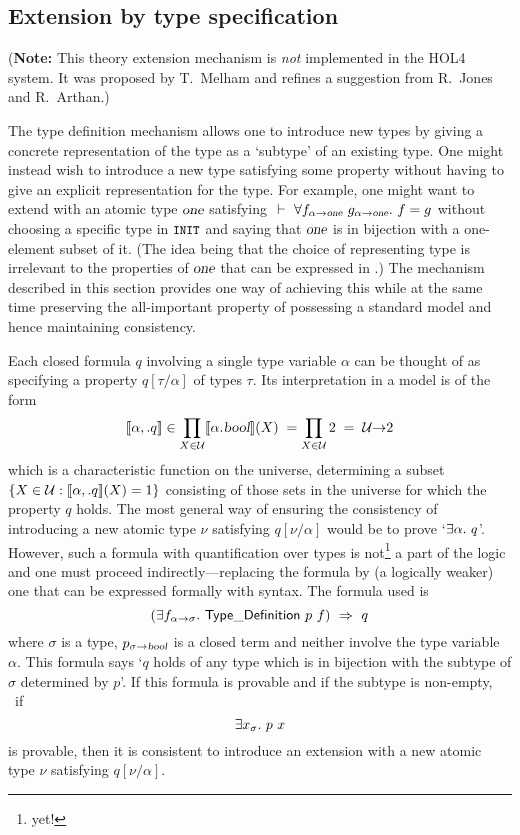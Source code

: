 \subsection{Extension by type specification}
\label{tyspecs}
\noindent
(\textbf{Note:} This theory extension mechanism is \emph{not}
implemented in the HOL4 system. It was proposed by T.~Melham and
refines a suggestion from R.~Jones and R.~Arthan.)

\smallskip
\noindent The type definition
mechanism allows one to introduce new types by giving a concrete
representation of the type as a `subtype' of an existing type. One
might instead wish to introduce a new type satisfying some property
without having to give an explicit representation for the type. For
example, one might want to extend  with an atomic type
$\textsl{one}$ satisfying $\ \vdash\ \forall f_{\alpha{\to}\textsl{one}}\
  g_{\alpha{\to}\textsl{one}}.\ f=g$ without choosing a specific type in
$\hbox{{\small\tt INIT}}$ and saying that $\textsl{one}$ is in bijection with a
one-element subset of it. (The idea being that the choice of
representing type is irrelevant to the properties of $\textsl{one}$ that
can be expressed in \HOL.) The mechanism described in this section
provides one way of achieving this while at the same time preserving
the all-important property of possessing a standard model and hence
maintaining consistency.

Each closed formula $q$ involving a single type variable $\alpha$ can
be thought of as specifying a property $q[\tau/\alpha]$ of types
$\tau$. Its interpretation in a model is of the form
\[
[\![\alpha,.q]\!]\in \prod_{X\in{\cal U}}[\![\alpha.\textsl{bool}]\!](X)
\;= \prod_{X\in{\cal U}}\mbox{\rm 2} \;=\; {\cal U}{\to}\mbox{\rm 2}
\]
which is a characteristic function on the universe, determining a
subset $\{X\in{\cal U}:[\![\alpha,.q]\!](X)=1\}$ consisting of those
sets in the universe for which the property $q$ holds. The most
general way of ensuring the consistency of introducing a new atomic
type $\nu$ satisfying $q[\nu/\alpha]$ would be to prove
`$\exists \alpha.\ q$'. However, such a
formula with quantification over types is not\footnote{yet!} a part of
the \HOL{} logic and one must proceed indirectly---replacing the
formula by (a logically weaker) one that can be expressed formally with
\HOL{} syntax. The formula used is
\[
(\exists f_{\alpha{\to}\sigma}.\ {\sf Type\_Definition}\ p\ f)\ \Rightarrow\ q
\]
where $\sigma$ is a type, $p_{\sigma{\to}\textsl{bool}}$ is a closed term
and neither involve the type variable $\alpha$. This formula says `$q$
holds of any type which is in bijection with the subtype of $\sigma$
determined by $p$'. If this formula is provable and if the subtype is
non-empty, \ie\ if
\[
\exists x_\sigma.\ p\ x
\]
is provable, then it is consistent to introduce an extension with a new
atomic type $\nu$ satisfying $q[\nu/\alpha]$.

